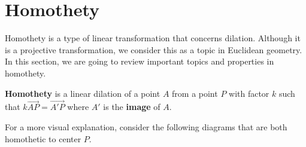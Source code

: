\documentclass[../../../main.tex]{subfiles}
\begin{document}
\section{Homothety}

Homothety is a type of linear transformation that concerns dilation.
Although it is a projective transformation, we consider this as a
topic in Euclidean geometry. In this section, we are going to review
important topics and properties in homothety.

\begin{definition}{}{}
\textbf{Homothety} is a linear dilation of a point $A$ from a point
$P$ with factor $k$ such that $k\vec{AP} = \vec{A'P}$ where $A'$ is
the \textbf{image} of $A$.
\end{definition}

For a more visual explanation, consider the following diagrams that
are both homothetic to center $P$.
\end{document}
